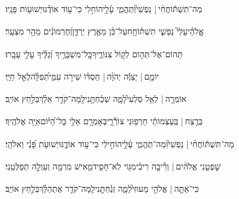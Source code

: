 \documentclass[12pt]{article}
\newcommand{\loc}[1]{\textsuperscript{\locf{#1}}}
\begin{document}
{\loc{ ו}~}‏מַה־תִּשְׁתּ֬וֹחֲחִ֨י |  נַפְשִׁי֮{\hfill}וַתֶּהֱמִ֢י עָ֫לָ֥י\newline\hspace*{.5em}הוֹחִ֣לִי  כִּי־ע֥וֹד אוֹדֶ֗נּוּ{\hfill}יְשׁוּע֥וֹת פָּנָֽיו׃\par

{\loc{ ז}~}‏אֱֽלֹהַ֗י{\hfill}עָלַי֮ נַפְשִׁ֢י תִשְׁתּ֫וֹחָ֥ח\newline\hspace*{.5em}עַל־כֵּ֗ן  מֵאֶ֣רֶץ יַרְדֵּ֑ן{\hfill}וְ֝חֶרְמוֹנִ֗ים מֵהַ֥ר מִצְעָֽר׃\par

{\loc{ ח}~}‏תְּהוֹם־אֶל־תְּה֣וֹם  לְק֣וֹל צִנּוֹרֶ֑יךָ{\hfill}כׇּֽל־מִשְׁבָּרֶ֥יךָ וְ֝גַלֶּ֗יךָ עָלַ֥י עָבָֽרוּ׃\par

{\loc{ ט}~}‏יוֹמָ֤ם |  יְצַוֶּ֬ה יְהֹוָ֨ה |  חַסְדּ֗וֹ{\hfill} שִׁירֹ֣ה עִמִּ֑י\newline\hspace*{.5em}תְּ֝פִלָּ֗ה{\hfill}לְאֵ֣ל חַיָּֽי׃\par

{\loc{ י}~}‏אוֹמְרָ֤ה |  לְאֵ֥ל סַלְעִי֮{\hfill}לָמָ֢ה שְׁכַ֫חְתָּ֥נִי\newline\hspace*{.5em}לָֽמָּה־קֹדֵ֥ר אֵלֵ֗ךְ{\hfill}בְּלַ֣חַץ אוֹיֵֽב׃\par

{\loc{ יא}~}‏בְּרֶ֤צַח |  בְּֽעַצְמוֹתַ֗י חֵרְפ֥וּנִי צוֹרְﬞרָ֑י{\hfill}בְּאׇמְרָ֥ם אֵלַ֥י כׇּל־הַ֝יּ֗וֹם{\hfill}אַיֵּ֥ה אֱלֹהֶֽיךָ׃\par

{\loc{ יב}~}‏מַה־תִּשְׁתּ֬וֹחֲחִ֨י |  נַפְשִׁי֮{\hfill}וּֽמַה־תֶּהֱמִ֢י עָ֫לָ֥י\newline\hspace*{.5em}הוֹחִ֣ילִי  כִּי־ע֣וֹד אוֹדֶ֑נּוּ{\hfill}יְשׁוּעֹ֥ת פָּ֝נַ֗י וֵאלֹהָֽי׃\par\pend
\ledpb
\pstart[\subsection*{\textcolor{red}{פרק מג}}]\label{פרק מג}
{\loc{ א}~}‏שׇׁפְטֵ֤נִי אֱלֹהִ֨ים | {\hfill}וְרִ֘יבָ֤ה רִיבִ֗י\newline\hspace*{.5em}מִגּ֥וֹי לֹֽא־חָסִ֑יד{\hfill}מֵ֤אִישׁ מִרְמָ֖ה וְעַוְלָ֣ה תְפַלְּטֵֽנִי׃\par

{\loc{ ב}~}‏כִּי־אַתָּ֤ה |  אֱלֹהֵ֣י מָעוּזִּי֮{\hfill}לָמָ֢ה זְנַ֫חְתָּ֥נִי\newline\hspace*{.5em}לָֽמָּה־קֹדֵ֥ר אֶתְהַלֵּ֗ךְ{\hfill}בְּלַ֣חַץ אוֹיֵֽב׃\par
\end{document}
